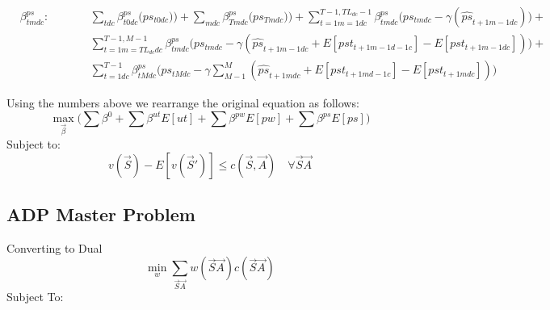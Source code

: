 \begin{fleqn}[\parindent]
	\begin{equation}\begin{alignedat}{10}
			& \beta^{ps}_{tmdc}: \qquad 
			&& \sum_{tdc} \beta_{t0dc}^{ps} \Big( ps_{t0dc}) \Big) + 
			\sum_{mdc} \beta_{Tmdc}^{ps} \Big( ps_{Tmdc}) \Big) + 
			\sum_{t=1m=1dc}^{T-1, TL_{dc}-1} \beta_{tmdc}^{ps} 
			\Big( ps_{tmdc} - \gamma 
			(\hat{ps}_{t+1m-1dc}) \Big) + \\
			&	&& 
			\sum_{t=1m=TL_{dc}dc}^{T-1,M-1} \beta_{tmdc}^{ps} 
			\Big( ps_{tmdc} - \gamma 
			(\hat{ps}_{t+1m-1dc} + E[pst_{t+1m-1d-1c}] - E[pst_{t+1m-1dc}]) \Big) + \\
			&	&& \sum_{t=1dc}^{T-1} \beta_{tMdc}^{ps} 
			\Big( ps_{tMdc} - \gamma \sum_{M-1}^{M}
			(\hat{ps}_{t+1mdc} + E[pst_{t+1md-1c}] - E[pst_{t+1mdc}]) \Big)
	\end{alignedat} \end{equation}
\end{fleqn}

Using the numbers above we rearrange the original equation as follows:
\begin{equation}
	\max_{\vec{\beta}} \Big( \sum \beta^{0} + \sum \beta^{ut} E[ut] + \sum \beta^{pw} E[pw] + \sum \beta^{ps} E[ps] \Big)
\end{equation}
Subject to:
\begin{equation}
	v(\vec{S}) - E[v(\vec{S}')] \le c(\vec{S}, \vec{A}) \quad \forall \vec{S} \vec{A} 
\end{equation}


\subsection{ADP Master Problem}
\label{Dual of ADP LP}
Converting to Dual
\begin{equation}
	\min_{w} \sum_{\vec{S} \vec{A}} w(\vec{S} \vec{A}) c(\vec{S} \vec{A})
\end{equation}
Subject To:

